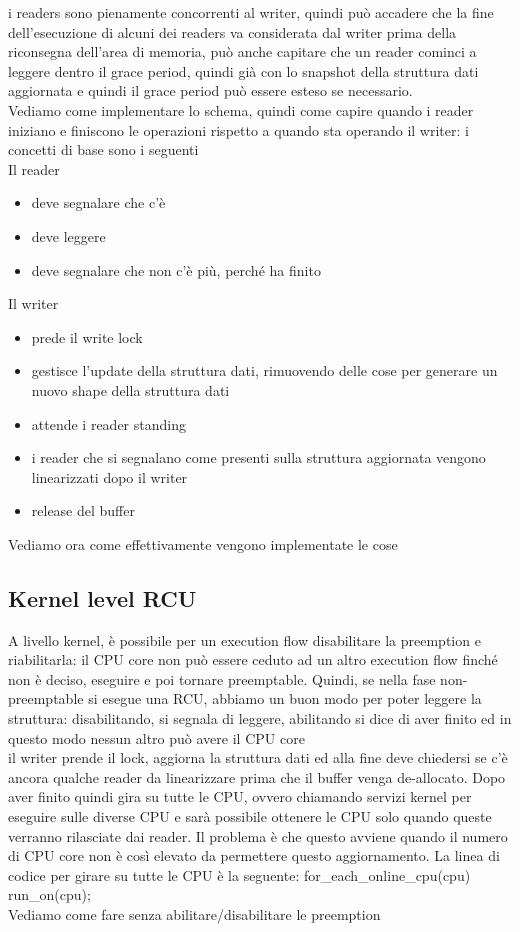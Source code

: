 \documentclass[12pt, oneside]{extbook}
\begin{document}
i readers sono pienamente concorrenti al writer, quindi può accadere che la fine dell'esecuzione di alcuni dei readers va considerata dal writer prima della riconsegna dell'area di memoria, può anche capitare che un reader cominci a leggere dentro il grace period, quindi già con lo snapshot della struttura dati aggiornata e quindi il grace period può essere esteso se necessario.\\Vediamo come implementare lo schema, quindi come capire quando i reader iniziano e finiscono le operazioni rispetto a quando sta operando il writer: i concetti di base sono i seguenti\\
Il reader
\begin{itemize}
\item deve segnalare che c'è
\item deve leggere
\item deve segnalare che non c'è più, perché ha finito
\end{itemize}
Il writer
\begin{itemize}
\item prede il write lock
\item gestisce l'update della struttura dati, rimuovendo delle cose per generare un nuovo shape della struttura dati
\item attende i reader standing
\item i reader che si segnalano come presenti sulla struttura aggiornata vengono linearizzati dopo il writer
\item release del buffer
\end{itemize}
Vediamo ora come effettivamente vengono implementate le cose
\subsection{Kernel level RCU}
A livello kernel, è possibile per un execution flow disabilitare la preemption e riabilitarla: il CPU core non può essere ceduto ad un altro execution flow finché non è deciso, eseguire e poi tornare preemptable. Quindi, se nella fase non-preemptable si esegue una RCU, abbiamo un buon modo per poter leggere la struttura: disabilitando, si segnala di leggere, abilitando si dice di aver finito ed in questo modo nessun altro può avere il CPU core\\ il writer prende il lock, aggiorna la struttura dati ed alla fine deve chiedersi se c'è ancora qualche reader da linearizzare prima che il buffer venga de-allocato. Dopo aver finito quindi gira su tutte le CPU, ovvero chiamando servizi kernel per eseguire sulle diverse CPU e sarà possibile ottenere le CPU solo quando queste verranno rilasciate dai reader. Il problema è che questo avviene quando il numero di CPU core non è così elevato da permettere questo aggiornamento. La linea di codice per girare su tutte le CPU è la seguente: \textsf{for\_each\_online\_cpu(cpu) run\_on(cpu);}\\ Vediamo come fare senza abilitare/disabilitare le preemption
\end{document}
